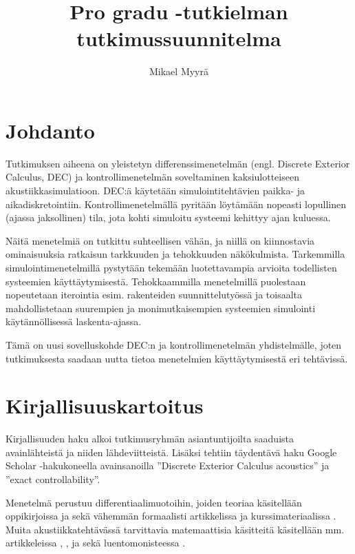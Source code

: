 \documentclass[utf8]{gradu3}
\title{Pro gradu -tutkielman tutkimussuunnitelma}
\author{Mikael Myyrä}
\begin{document}
\maketitle
\mainmatter
\sloppypar

\chapter{Johdanto}

Tutkimuksen aiheena on yleistetyn differenssimenetelmän
(engl. Discrete Exterior Calculus, DEC) ja kontrollimenetelmän
soveltaminen kaksiulotteiseen akustiikkasimulatioon.
DEC:ä käytetään simulointitehtävien paikka- ja aikadiskretointiin.
Kontrollimenetelmällä pyritään löytämään nopeasti lopullinen (ajassa jaksollinen) tila,
jota kohti simuloitu systeemi kehittyy ajan kuluessa.

Näitä menetelmiä on tutkittu suhteellisen vähän,
ja niillä on kiinnostavia ominaisuuksia
ratkaisun tarkkuuden ja tehokkuuden näkökulmista.
Tarkemmilla simulointimenetelmillä pystytään tekemään luotettavampia arvioita
todellisten systeemien käyttäytymisestä.
Tehokkaammilla menetelmillä puolestaan nopeutetaan iterointia
esim. rakenteiden suunnittelutyössä
ja toisaalta mahdollistetaan suurempien
ja monimutkaisempien systeemien simulointi
käytännöllisessä laskenta-ajassa.

Tämä on uusi sovelluskohde DEC:n ja kontrollimenetelmän yhdistelmälle,
joten tutkimuksesta saadaan uutta tietoa menetelmien käyttäytymisestä eri tehtävissä.

\chapter{Kirjallisuuskartoitus}

Kirjallisuuden haku alkoi tutkimusryhmän asiantuntijoilta saaduista avainlähteistä
ja niiden lähdeviitteistä.
Lisäksi tehtiin täydentävä haku Google Scholar -hakukoneella
avainsanoilla ''Discrete Exterior Calculus acoustics'' ja ''exact controllability''.

Menetelmä perustuu differentiaalimuotoihin, joiden teoriaa käsitellään
oppikirjoissa \parencite{abraham_manifolds_2012} ja \parencite{lee_introduction_2012}
sekä vähemmän formaalisti artikkelissa \parencite{blair_perot_differential_2014}
ja kurssimateriaalissa \parencite{crane_digital_2013}.
Muita akustiikkatehtävässä tarvittavia matemaattisia käsitteitä
käsitellään mm. artikkeleissa \parencite{lohi_whitney_2021},
\parencite{engquist_absorbing_1977}, \parencite{mur_finite-element_1993}
ja \parencite{plessix_review_2006} sekä luentomonisteessa \parencite{gillette_notes_2009}.
\end{document}
